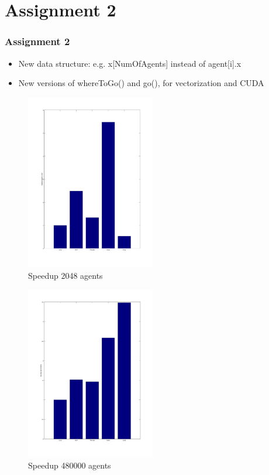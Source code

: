 \documentclass{beamer}
\begin{document}
\section{Assignment 2}
\begin{frame}
	\frametitle{Assignment 2}
	\begin{itemize}
	\item
	New data structure: e.g. x[NumOfAgents] instead of agent[i].x
	\item
	New versions of whereToGo() and go(), for vectorization and CUDA
	\end{itemize}
\end{frame}

\begin{frame}
	\begin{figure}[h!]
	\includegraphics[width=0.5\textwidth]{lab2graph1.png}
	\caption{Speedup 2048 agents}
	\end{figure}
\end{frame}

\begin{frame}
	\begin{figure}[h!]
	\includegraphics[width=0.5\textwidth]{lab2graph2.png}
	\caption{Speedup 480000 agents}
	\end{figure}
\end{frame}
\end{document}
